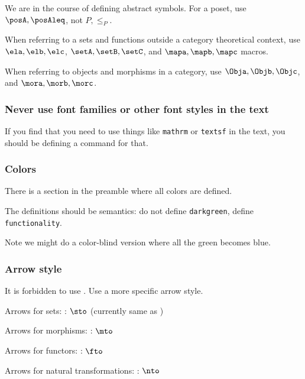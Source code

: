 We are in the course of defining abstract symbols.
For a poset, use $\posA,\posAleq$, not $P,\leq_P$.

When referring to a sets and functions outside a category theoretical context,   use $\ela,\elb,\elc$, $\setA,\setB,\setC$, and $\mapa,\mapb,\mapc$ macros.

When referring to objects and morphisms in a category,   use $\Obja,\Objb,\Objc$, and $\mora,\morb,\morc$.

\subsubsection*{Never use font families or other font styles in the text}

If you find that you need to use things like \texttt{mathrm} or \texttt{textsf} in the text, you should be defining a command for that.

\subsubsection*{Colors}

There is a section in the preamble where all colors are defined.

The definitions should be semantics: do not define \texttt{darkgreen}, define \texttt{fun\-ctionality}.

Note we might do a color-blind version where all the green becomes blue.

\subsubsection*{Arrow style}

It is forbidden to use \str{\to}.
Use a more specific arrow style.

Arrows for sets: \str{\sto}: $\sto$ (currently same as )

Arrows for morphisms: \str{\mto}: $\mto$

Arrows for functors: \str{\fto}: $\fto$

Arrows for natural transformations: \str{\nto}: $\nto$

%
%
%
%

